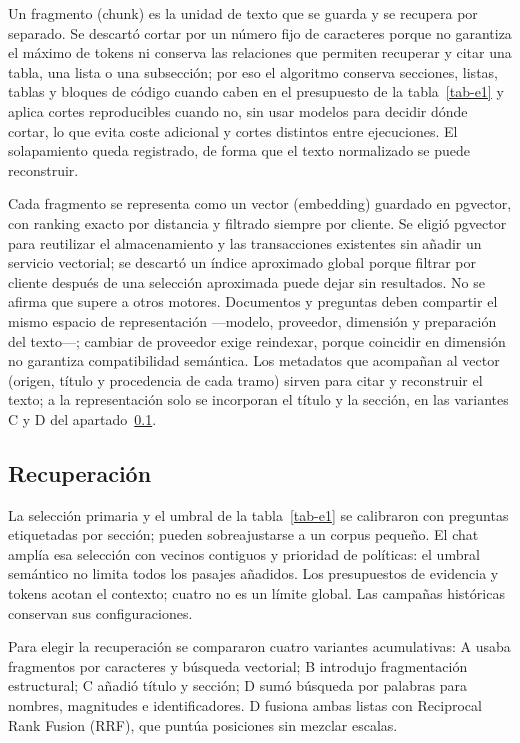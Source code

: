 Un fragmento (chunk) es la unidad de texto que se guarda y se recupera por separado. Se descartó cortar por un número fijo de caracteres porque no garantiza el máximo de tokens ni conserva las relaciones que permiten recuperar y citar una tabla, una lista o una subsección; por eso el algoritmo conserva secciones, listas, tablas y bloques de código cuando caben en el presupuesto de la tabla~\ref{tab-e1} y aplica cortes reproducibles cuando no, sin usar modelos para decidir dónde cortar, lo que evita coste adicional y cortes distintos entre ejecuciones. El solapamiento queda registrado, de forma que el texto normalizado se puede reconstruir. \cite{especificaciones}

Cada fragmento se representa como un vector (embedding) guardado en pgvector, con ranking exacto por distancia y filtrado siempre por cliente. Se eligió pgvector para reutilizar el almacenamiento y las transacciones existentes sin añadir un servicio vectorial; se descartó un índice aproximado global porque filtrar por cliente después de una selección aproximada puede dejar sin resultados. No se afirma que supere a otros motores. Documentos y preguntas deben compartir el mismo espacio de representación ---modelo, proveedor, dimensión y preparación del texto---; cambiar de proveedor exige reindexar, porque coincidir en dimensión no garantiza compatibilidad semántica. Los metadatos que acompañan al vector (origen, título y procedencia de cada tramo) sirven para citar y reconstruir el texto; a la representación solo se incorporan el título y la sección, en las variantes C y D del apartado~\ref{e-3}.

\subsection{Recuperación}\label{e-3}

La selección primaria y el umbral de la tabla~\ref{tab-e1} se calibraron con preguntas etiquetadas por sección; pueden sobreajustarse a un corpus pequeño. El chat amplía esa selección con vecinos contiguos y prioridad de políticas: el umbral semántico no limita todos los pasajes añadidos. Los presupuestos de evidencia y tokens acotan el contexto; cuatro no es un límite global. Las campañas históricas conservan sus configuraciones. \cite{recuperacion-chat}

Para elegir la recuperación se compararon cuatro variantes acumulativas: A usaba fragmentos por caracteres y búsqueda vectorial; B introdujo fragmentación estructural; C añadió título y sección; D sumó búsqueda por palabras para nombres, magnitudes e identificadores. D fusiona ambas listas con Reciprocal Rank Fusion (RRF), que puntúa posiciones sin mezclar escalas. \cite{adr,informe-rag}


